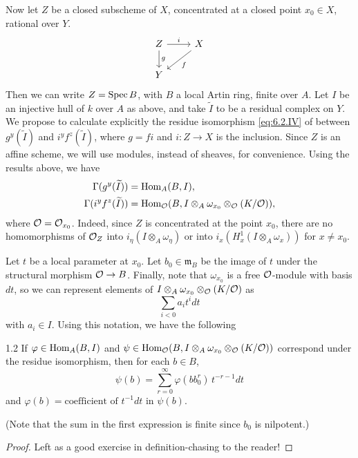 Now let $Z$ be a closed subscheme of $X$, concentrated at a closed point $x_{0} \in X$, rational over $Y$.
\[
\begin{tikzcd}
	Z\ar[r,"i"]\ar[d,"g"]&X\ar[ld,"f"]\\
	Y
\end{tikzcd}
\]
Then we can write $Z = \operatorname{Spec} B$, with $B$ a local Artin ring, finite over $A$. Let $I$ be an injective hull of $k$ over $A$ as above, and take $\widetilde{I}$ to be a residual complex on $Y$. We propose to calculate explicitly the residue isomorphism \eqref{eq:6.2.IV} of  between $g^{y}(\widetilde{I})$ and $i^{y}f^{z}(\widetilde{I})$, where $g = fi$ and $i: Z \to X$ is the inclusion. Since $Z$ is an affine scheme, we will use modules, instead of sheaves, for convenience. Using the results above, we have
\begin{align*}
\Gamma(g^{y}(\widetilde{I})) &= \operatorname{Hom}_{A}(B, I),\\
\Gamma(i^{y}f^{z}(\widetilde{I})) &= \operatorname{Hom}_{\mathcal{O}}(B, I \otimes_{A} \omega_{x_{0}} \otimes_{\mathcal{O}} (K/\mathcal{O})),
\end{align*}
where $\mathcal{O} = \mathcal{O}_{x_{0}}$. Indeed, since $Z$ is concentrated at the point $x_{0}$, there are no homomorphisms of $\mathcal{O}_{Z}$ into $i_{\eta}(I \otimes_{A} \omega_{\eta})$ or into $i_{x}(H^{1}_{x}(I \otimes_{A} \omega_{x}))$ for $x \neq x_{0}$.

Let $t$ be a local parameter at $x_{0}$. Let $b_{0} \in \mathfrak{m}_{B}$ be the image of $t$ under the structural morphism $\mathcal{O} \to B$. Finally, note that $\omega_{x_{0}}$ is a free $\mathcal{O}$-module with basis $dt$, so we can represent elements of $I \otimes_{A} \omega_{x_{0}} \otimes_{\mathcal{O}} (K/\mathcal{O})$ as
\[
\sum_{i < 0} a_{i} t^{i} dt
\]
with $a_{i} \in I$. Using this notation, we have the following

\begin{booklemma}{1.2}\label{lem:7.1.2}
If $\varphi \in \operatorname{Hom}_{A}(B, I)$ and $\psi \in \operatorname{Hom}_{\mathcal{O}}(B, I \otimes_A \omega_{x_0} \otimes_{\mathcal{O}} (K/\mathcal{O}))$ correspond under the residue isomorphism, then for each $b \in B$,
\[
\psi(b) = \sum_{r=0}^{\infty} \varphi(b b_{0}^{r})\, t^{-r-1} dt
\]
and $\varphi(b) = \text{coefficient of } t^{-1}dt \text{ in } \psi(b)$.

(Note that the sum in the first expression is finite since $b_{0}$ is nilpotent.)
\end{booklemma}

\begin{proof}
Left as a good exercise in definition-chasing to the reader!
\end{proof}

